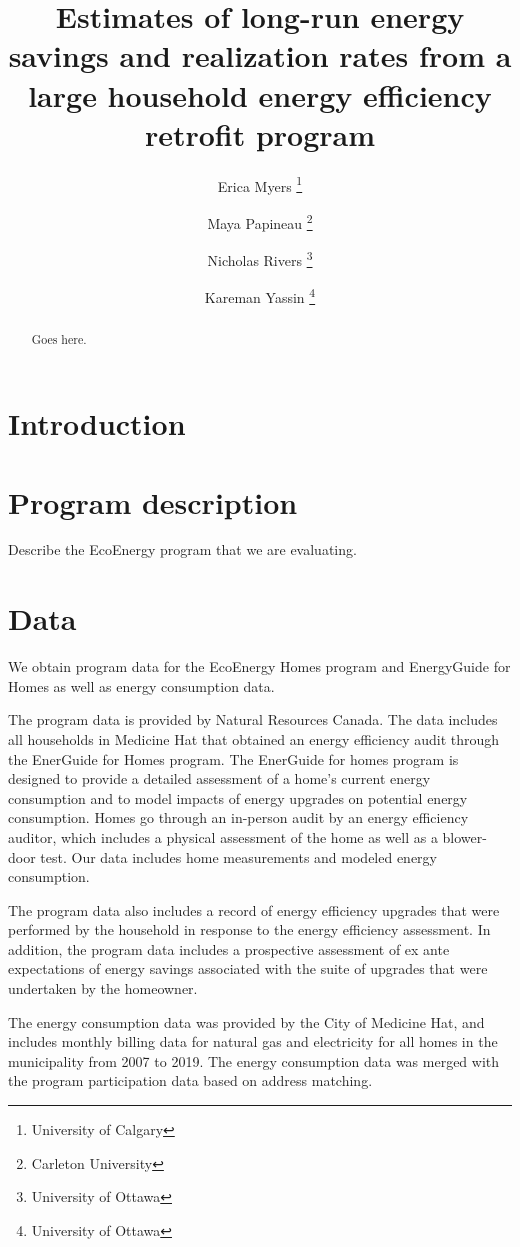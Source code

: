 \documentclass{article}
\author{
    Erica Myers \thanks{University of Calgary}
    \and
    Maya Papineau \thanks{Carleton University}
    \and
    Nicholas Rivers \thanks{University of Ottawa}
    \and 
    Kareman Yassin \thanks{University of Ottawa}
}
\title{
    Estimates of long-run energy savings and realization rates from a large household energy efficiency retrofit program
}
\begin{document}
\maketitle

\begin{abstract}
	Goes here.
\end{abstract}

\section{Introduction}

\section{Program description}
Describe the EcoEnergy program that we are evaluating.

\section{Data}
We obtain program data for the EcoEnergy Homes program and EnergyGuide for Homes as well as energy consumption data.

The program data is provided by Natural Resources Canada. The data includes all households in Medicine Hat that obtained an energy efficiency audit through the EnerGuide for Homes program. The EnerGuide for homes program is designed to provide a detailed assessment of a home's current energy consumption and to model impacts of energy upgrades on potential energy consumption. Homes go through an in-person audit by an energy efficiency auditor, which includes a physical assessment of the home as well as a blower-door test. Our data includes home measurements and modeled energy consumption.

The program data also includes a record of energy efficiency upgrades that were performed by the household in response to the energy efficiency assessment. In addition, the program data includes a prospective assessment of ex ante expectations of energy savings associated with the suite of upgrades that were undertaken by the homeowner.

The energy consumption data was provided by the City of Medicine Hat, and includes monthly billing data for natural gas and electricity for all homes in the municipality from 2007 to 2019.  The energy consumption data was merged with the program participation data based on address matching.
\end{document}

